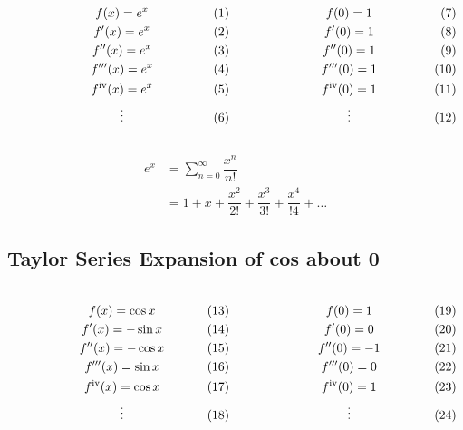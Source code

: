 \documentclass{article}
\begin{document}
$\begin{array}{c c}
	\parbox[c]{0.5\textwidth}{
		\begin{gather*}
			f(x) = e^x\\
			f'(x) = e^x\\
			f''(x) = e^x\\
			f'''(x) = e^x\\
			f^{\text{iv}}(x) = e^x\\
			\vdots
		\end{gather*}}
	&
	\parbox[c]{0.5\textwidth}{
		\begin{gather*}
			f(0) = 1\\
			f'(0) = 1\\
			f''(0) = 1\\
			f'''(0) = 1\\
			f^{\text{iv}}(0) = 1\\
			\vdots
		\end{gather*}}
\end{array}$

\begin{align*}
	e^x &= \sum_{n = 0}^{\infty}\dfrac{x^n}{n!}\\
		&= 1+x+\dfrac{x^2}{2!}+\dfrac{x^3}{3!}+\dfrac{x^4}{!4}+\dots
\end{align*}

\begin{center}
\end{center}

\subsection{Taylor Series Expansion of cos about 0}

$\begin{array}{c c}
	\parbox[c]{0.5\textwidth}{
	\begin{gather*}
		f(x) = \cos x\\
		f'(x) = -\sin x\\
		f''(x) = -\cos x\\
		f'''(x) = \sin x\\
		f^{\text{iv}}(x) = \cos x\\
		\vdots
	\end{gather*}}
&
	\parbox[c]{0.5\textwidth}{
	\begin{gather*}
		f(0) = 1\\
		f'(0) = 0\\
		f''(0) = -1\\
		f'''(0) = 0\\
		f^{\text{iv}}(0) = 1\\
		\vdots
	\end{gather*}}
\end{array}$
\end{document}
